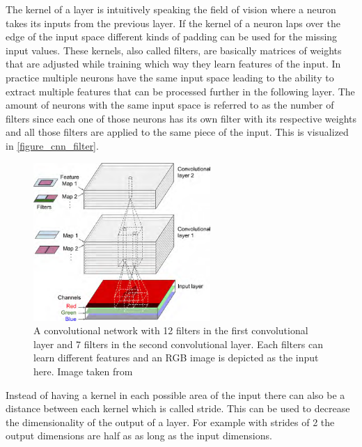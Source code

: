 The kernel of a layer is intuitively speaking the field of vision where a neuron takes its inputs from
the previous layer. If the kernel of a neuron laps over the edge
of the input space different kinds of padding can be used for the missing input values.
These kernels, also called filters, are basically matrices of weights that are
adjusted while training which way they learn features of the input. In practice multiple neurons have
the same input space leading to the ability to extract multiple features that can be processed
further in the following layer. The amount of neurons with the same input space is referred to as
the number of filters since each one of those neurons has its own filter with its respective
weights and all those filters are applied to the same piece of the input. This is visualized in
\autoref{figure_cnn_filter}.

\begin{figure}[h]
    \centering
    \includegraphics[width=0.6\textwidth]{images/figures/convolutional_net_multiple_filters.png}
    \caption{A convolutional network with 12 filters in the first convolutional layer and 7
    filters in the second convolutional layer. Each filters can learn different features and an
    RGB image is depicted as the input here.
    Image taken from \parencite{2017-geron-homl}} \label{figure_cnn_filter}
\end{figure}

Instead of having a kernel in each possible area of the input there can also be a distance between
each kernel which is called stride. This can be used to decrease the dimensionality of the output
of a layer. For example with strides of 2 the output dimensions are half as as long as the input
dimensions.

